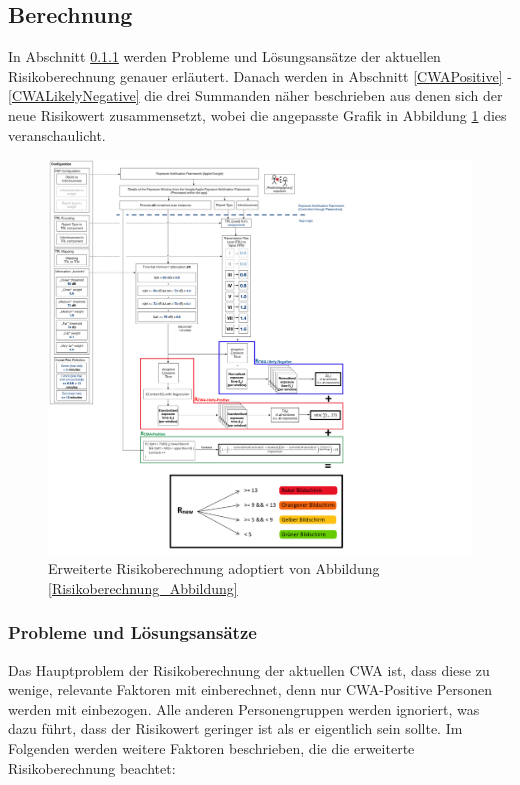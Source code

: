 \documentclass[conference,compsoc]{IEEEtran}
\begin{document}
\subsection{Berechnung}
\label{Berechnung}

In Abschnitt \ref{Probleme_und_Loesungsansaetze_Risikoberechnung} werden Probleme und Lösungsansätze der aktuellen Risikoberechnung genauer erläutert.
Danach werden in Abschnitt \ref{CWAPositive} - \ref{CWALikelyNegative} die drei Summanden näher beschrieben aus denen sich der neue Risikowert zusammensetzt,
wobei die angepasste Grafik in Abbildung \ref{ErweiterteRisikoberechnung_Abbildung} dies veranschaulicht.

\begin{figure}[htbp]
	\centering
	\includegraphics[width=1.4\textwidth]{"RiskCalculation"}
	\caption{Erweiterte Risikoberechnung adoptiert von Abbildung \ref{Risikoberechnung_Abbildung}}
	\label{ErweiterteRisikoberechnung_Abbildung}
\end{figure}

\subsubsection{Probleme und Lösungsansätze}
\label{Probleme_und_Loesungsansaetze_Risikoberechnung}

Das Hauptproblem der Risikoberechnung der aktuellen CWA ist, dass diese zu wenige, relevante Faktoren mit einberechnet, denn nur CWA-Positive Personen werden mit einbezogen.
Alle anderen Personengruppen werden ignoriert, was dazu führt, dass  der Risikowert geringer ist als er eigentlich sein sollte. 
Im Folgenden werden weitere Faktoren beschrieben, die die erweiterte Risikoberechnung beachtet:
\end{document}

